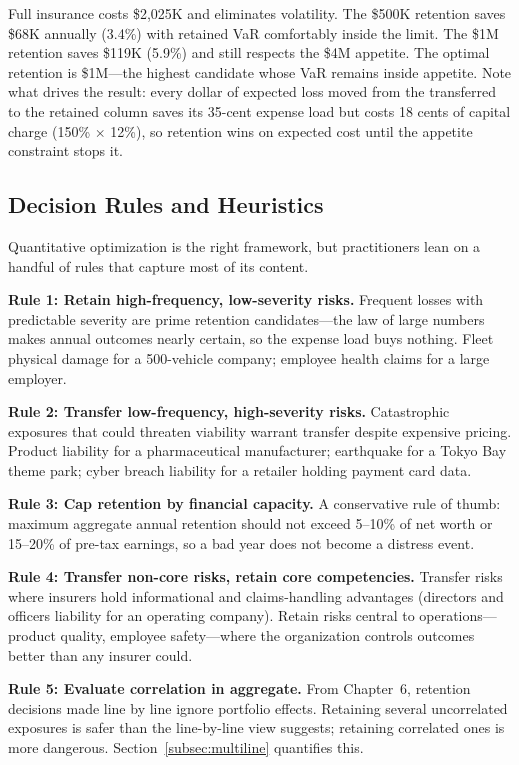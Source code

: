 \documentclass[11pt,openany]{book}
\begin{document}
Full insurance costs \$2,025K and eliminates volatility. The \$500K retention
saves \$68K annually (3.4\%) with retained VaR comfortably inside the limit.
The \$1M retention saves \$119K (5.9\%) and still respects the \$4M appetite.
The optimal retention is \$1M---the highest candidate whose VaR remains
inside appetite. Note what drives the result: every dollar of expected loss
moved from the transferred to the retained column saves its 35-cent expense
load but costs 18 cents of capital charge (150\% \(\times\) 12\%), so
retention wins on expected cost until the appetite constraint stops it.

\subsection{Decision Rules and Heuristics}

Quantitative optimization is the right framework, but practitioners lean on a
handful of rules that capture most of its content.

\textbf{Rule 1: Retain high-frequency, low-severity risks.} Frequent losses
with predictable severity are prime retention candidates---the law of large
numbers makes annual outcomes nearly certain, so the expense load buys
nothing. Fleet physical damage for a 500-vehicle company; employee health
claims for a large employer.

\textbf{Rule 2: Transfer low-frequency, high-severity risks.} Catastrophic
exposures that could threaten viability warrant transfer despite expensive
pricing. Product liability for a pharmaceutical manufacturer; earthquake for
a Tokyo Bay theme park; cyber breach liability for a retailer holding payment
card data.

\textbf{Rule 3: Cap retention by financial capacity.} A conservative rule of
thumb: maximum aggregate annual retention should not exceed 5--10\% of net
worth or 15--20\% of pre-tax earnings, so a bad year does not become a
distress event.

\textbf{Rule 4: Transfer non-core risks, retain core competencies.} Transfer
risks where insurers hold informational and claims-handling advantages
(directors and officers liability for an operating company). Retain risks
central to operations---product quality, employee safety---where the
organization controls outcomes better than any insurer could.

\textbf{Rule 5: Evaluate correlation in aggregate.} From
Chapter~6, retention decisions made line by line
ignore portfolio effects. Retaining several uncorrelated exposures is safer
than the line-by-line view suggests; retaining correlated ones is more
dangerous. Section~\ref{subsec:multiline} quantifies this.
\end{document}
